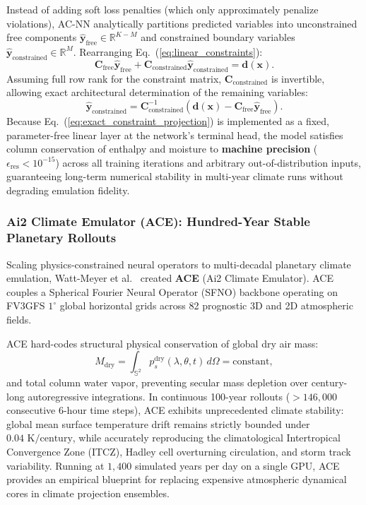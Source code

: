 Instead of adding soft loss penalties (which only approximately penalize violations), AC-NN analytically partitions predicted variables into unconstrained free components $\hat{\mathbf{y}}_{\text{free}} \in \mathbb{R}^{K-M}$ and constrained boundary variables $\hat{\mathbf{y}}_{\text{constrained}} \in \mathbb{R}^M$. Rearranging Eq.~(\ref{eq:linear_constraints}):
\begin{equation}
    \mathbf{C}_{\text{free}} \hat{\mathbf{y}}_{\text{free}} + \mathbf{C}_{\text{constrained}} \hat{\mathbf{y}}_{\text{constrained}} = \mathbf{d}(\mathbf{x}).
\end{equation}
Assuming full row rank for the constraint matrix, $\mathbf{C}_{\text{constrained}}$ is invertible, allowing exact architectural determination of the remaining variables:
\begin{equation}
    \hat{\mathbf{y}}_{\text{constrained}} = \mathbf{C}_{\text{constrained}}^{-1} \left( \mathbf{d}(\mathbf{x}) - \mathbf{C}_{\text{free}} \hat{\mathbf{y}}_{\text{free}} \right).
    \label{eq:exact_constraint_projection}
\end{equation}
Because Eq.~(\ref{eq:exact_constraint_projection}) is implemented as a fixed, parameter-free linear layer at the network's terminal head, the model satisfies column conservation of enthalpy and moisture to \textbf{machine precision} ($\epsilon_{\text{res}} < 10^{-15}$) across all training iterations and arbitrary out-of-distribution inputs, guaranteeing long-term numerical stability in multi-year climate runs without degrading emulation fidelity.

\subsubsection{Ai2 Climate Emulator (ACE): Hundred-Year Stable Planetary Rollouts}
Scaling physics-constrained neural operators to multi-decadal planetary climate emulation, Watt-Meyer et al.~\cite{wattmeyer2024ace} created \textbf{ACE} (Ai2 Climate Emulator). ACE couples a Spherical Fourier Neural Operator (SFNO) backbone operating on FV3GFS $1^\circ$ global horizontal grids across 82 prognostic 3D and 2D atmospheric fields.

ACE hard-codes structural physical conservation of global dry air mass:
\begin{equation}
    M_{\text{dry}} = \int_{\mathbb{S}^2} p_s^{\text{dry}}(\lambda, \theta, t) \, d\Omega = \text{constant},
\end{equation}
and total column water vapor, preventing secular mass depletion over century-long autoregressive integrations. In continuous 100-year rollouts ($>146{,}000$ consecutive 6-hour time steps), ACE exhibits unprecedented climate stability: global mean surface temperature drift remains strictly bounded under \textbf{$0.04\text{ K/century}$}, while accurately reproducing the climatological Intertropical Convergence Zone (ITCZ), Hadley cell overturning circulation, and storm track variability. Running at $1{,}400$ simulated years per day on a single GPU, ACE provides an empirical blueprint for replacing expensive atmospheric dynamical cores in climate projection ensembles.

